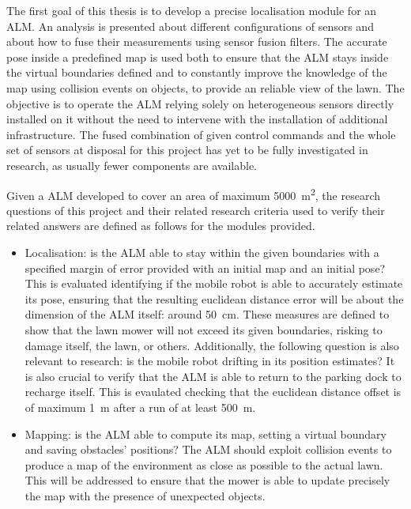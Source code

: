 The first goal of this thesis is to develop a precise localisation module for an \gls{ALM}.
An analysis is presented about different configurations of sensors and about how to fuse their measurements using sensor fusion filters.
The accurate pose inside a predefined map is used both to ensure that the \gls{ALM} stays inside the virtual boundaries defined and to constantly improve the knowledge of the map using collision events on objects, to provide an reliable view of the lawn.
The objective is to operate the \gls{ALM} relying solely on heterogeneous sensors directly installed on it without the need to intervene with the installation of additional infrastructure.
The fused combination of given control commands and the whole set of sensors at disposal for this project has yet to be fully investigated in research, as usually fewer components are available.


Given a \gls{ALM} developed to cover an area of maximum \SI{5000}{\meter\squared}, the research questions of this project and their related research criteria used to verify their related answers are defined as follows for the modules provided.
\begin{itemize}
    \item Localisation: is the \gls{ALM} able to stay within the given boundaries with a specified margin of error provided with an initial map and an initial pose?
    This is evaluated identifying if the mobile robot is able to accurately estimate its pose, ensuring that the resulting euclidean distance error will be about the dimension of the \gls{ALM} itself: around \SI{50}{\cm}.
    These measures are defined to show that the lawn mower will not exceed its given boundaries, risking to damage itself, the lawn, or others.
    Additionally, the following question is also relevant to research: is the mobile robot drifting in its position estimates?
    It is also crucial to verify that the \gls{ALM} is able to return to the parking dock to recharge itself.
    This is evaulated checking that the euclidean distance offset is of maximum \SI{1}{\m} after a run of at least \SI{500}{\m}. 
    \item Mapping: is the \gls{ALM} able to compute its map, setting a virtual boundary and saving obstacles' positions?
    The \gls{ALM} should exploit collision events to produce a map of the environment as close as possible to the actual lawn.
    This will be addressed to ensure that the mower is able to update precisely the map with the presence of unexpected objects.
\end{itemize}



